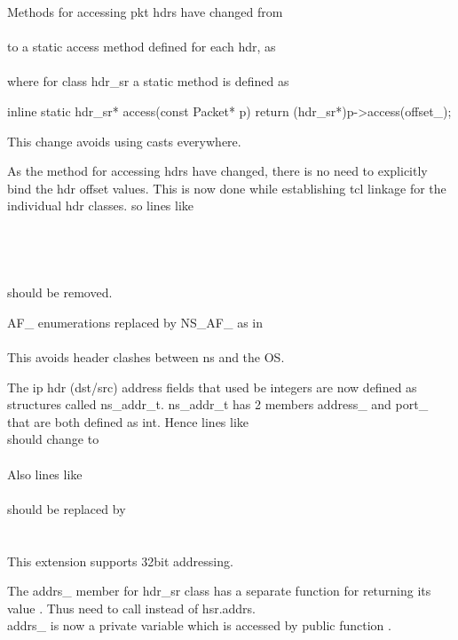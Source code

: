\begin{flushleft}

Methods for accessing pkt hdrs have changed from \\
 \\
to a static access method defined for each hdr, as \\
 \\
where for class hdr\_sr a static method  is defined as
\begin{program}
 inline static hdr_sr* access(const Packet* p) {
		 return (hdr_sr*)p->access(offset_); 
 }
\end{program}
 This change avoids using casts everywhere.


As the method for accessing hdrs have changed, there is no need to explicitly bind the hdr offset values. This is now done while establishing tcl linkage for the individual hdr classes.
so lines like \\
\\	
  \\
  \\
  \\
should be removed.

AF\_ enumerations replaced by NS\_AF\_ as in \\
\\
 This avoids header clashes between ns and the OS.


The ip hdr (dst/src) address fields that used be integers are now defined as structures called ns\_addr\_t. ns\_addr\_t has 2 members address\_ and port\_ that are both defined as int. 
Hence lines like \\
 should change to\\
 \\
Also lines like \\
 \\
should be replaced by \\
 \\
 \\
 This extension supports 32bit addressing.


The addrs\_ member for hdr\_sr class has a separate function for returning its value . Thus need to call  instead of hsr.addrs.\\
 addrs\_ is now a private variable which is accessed by public function .



\end{flushleft}
